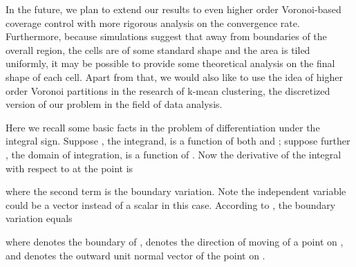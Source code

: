 \documentclass[letterpaper, 10 pt, conference]{ieeeconf}
\begin{document}
In the future, we plan to extend our results to even higher order Voronoi-based coverage control
with more rigorous analysis on the convergence rate. Furthermore, because simulations suggest that away from boundaries of the overall region, the cells are of some standard shape and the area is tiled uniformly, it may be possible to provide some theoretical analysis on the final shape of each cell.
Apart from that, we would also like to use the idea of higher order Voronoi partitions in the research of k-mean clustering, the discretized version of our problem in the field of data analysis.

\begin{appendix}
Here we  recall some basic facts in the problem of differentiation under the integral sign. Suppose , the integrand, is a function of both  and ; suppose further , the domain of integration, is a function of . Now the derivative of the integral with respect to  at the point  is

where the second term is the boundary variation. Note the independent variable  could be a vector instead of a scalar in this case. According to \cite{flanders1973differentiation}, the boundary variation equals

where  denotes the boundary of ,  denotes the direction of moving of a point  on , and  denotes the outward unit normal vector of the point  on .
\end{appendix}



\end{document}
